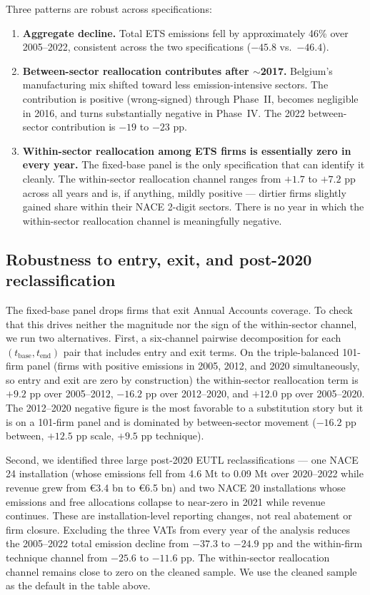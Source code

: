 Three patterns are robust across specifications:
\begin{enumerate}
    \item \textbf{Aggregate decline.} Total ETS emissions fell by approximately 46\% over 2005--2022, consistent across the two specifications ($-45.8$ vs.\ $-46.4$).

    \item \textbf{Between-sector reallocation contributes after $\sim$2017.} Belgium's manufacturing mix shifted toward less emission-intensive sectors. The contribution is positive (\ie wrong-signed) through Phase~II, becomes negligible in 2016, and turns substantially negative in Phase~IV. The 2022 between-sector contribution is $-19$ to $-23$ pp.

    \item \textbf{Within-sector reallocation among ETS firms is essentially zero in every year.} The fixed-base panel is the only specification that can identify it cleanly. The within-sector reallocation channel ranges from $+1.7$ to $+7.2$ pp across all years and is, if anything, mildly positive --- dirtier firms slightly gained share within their NACE 2-digit sectors. There is no year in which the within-sector reallocation channel is meaningfully negative.
\end{enumerate}

\subsection{Robustness to entry, exit, and post-2020 reclassification}

The fixed-base panel drops firms that exit Annual Accounts coverage. To check that this drives neither the magnitude nor the sign of the within-sector channel, we run two alternatives. First, a six-channel pairwise decomposition for each $(t_{\text{base}}, t_{\text{end}})$ pair that includes entry and exit terms. On the triple-balanced 101-firm panel (firms with positive emissions in 2005, 2012, and 2020 simultaneously, so entry and exit are zero by construction) the within-sector reallocation term is $+9.2$ pp over 2005--2012, $-16.2$ pp over 2012--2020, and $+12.0$ pp over 2005--2020. The 2012--2020 negative figure is the most favorable to a substitution story but it is on a 101-firm panel and is dominated by between-sector movement ($-16.2$ pp between, $+12.5$ pp scale, $+9.5$ pp technique).

Second, we identified three large post-2020 EUTL reclassifications --- one NACE 24 installation (whose emissions fell from 4.6 Mt to 0.09 Mt over 2020--2022 while revenue grew from €3.4 bn to €6.5 bn) and two NACE 20 installations whose emissions and free allocations collapse to near-zero in 2021 while revenue continues. These are installation-level reporting changes, not real abatement or firm closure. Excluding the three VATs from every year of the analysis reduces the 2005--2022 total emission decline from $-37.3$ to $-24.9$ pp and the within-firm technique channel from $-25.6$ to $-11.6$ pp. The within-sector reallocation channel remains close to zero on the cleaned sample. We use the cleaned sample as the default in the table above.

